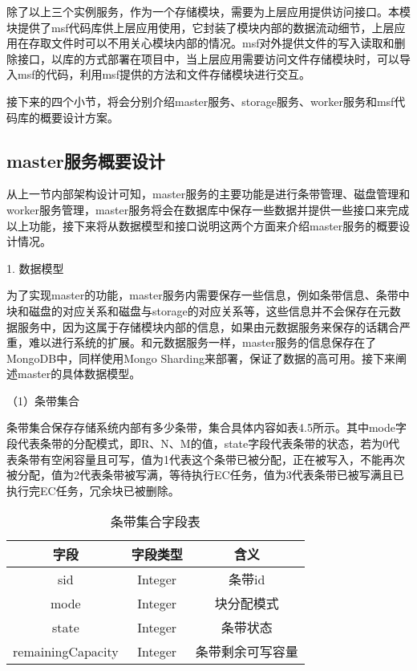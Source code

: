 除了以上三个实例服务，作为一个存储模块，需要为上层应用提供访问接口。本模块提供了msf代码库供上层应用使用，它封装了模块内部的数据流动细节，上层应用在存取文件时可以不用关心模块内部的情况。msf对外提供文件的写入读取和删除接口，以库的方式部署在项目中，当上层应用需要访问文件存储模块时，可以导入msf的代码，利用msf提供的方法和文件存储模块进行交互。

接下来的四个小节，将会分别介绍master服务、storage服务、worker服务和msf代码库的概要设计方案。

\subsection{master服务概要设计}

从上一节内部架构设计可知，master服务的主要功能是进行条带管理、磁盘管理和worker服务管理，master服务将会在数据库中保存一些数据并提供一些接口来完成以上功能，接下来将从数据模型和接口说明这两个方面来介绍master服务的概要设计情况。

1. 数据模型

为了实现master的功能，master服务内需要保存一些信息，例如条带信息、条带中块和磁盘的对应关系和磁盘与storage的对应关系等，这些信息并不会保存在元数据服务中，因为这属于存储模块内部的信息，如果由元数据服务来保存的话耦合严重，难以进行系统的扩展。和元数据服务一样，master服务的信息保存在了MongoDB中，同样使用Mongo Sharding来部署，保证了数据的高可用。接下来阐述master的具体数据模型。

（1）条带集合

条带集合保存存储系统内部有多少条带，集合具体内容如表4.5所示。其中mode字段代表条带的分配模式，即R、N、M的值，state字段代表条带的状态，若为0代表条带有空闲容量且可写，值为1代表这个条带已被分配，正在被写入，不能再次被分配，值为2代表条带被写满，等待执行EC任务，值为3代表条带已被写满且已执行完EC任务，冗余块已被删除。

\begin{table}[h]
    \centering
    \caption{条带集合字段表}
    \begin{tabular}{ccc}
      \toprule
      字段   & 字段类型   & 含义                          \\
      \midrule
      sid               & Integer   & 条带id             \\
      mode              & Integer   & 块分配模式          \\
      state             & Integer   & 条带状态            \\
      remainingCapacity & Integer   & 条带剩余可写容量     \\
      \bottomrule
    \end{tabular}
\end{table}

